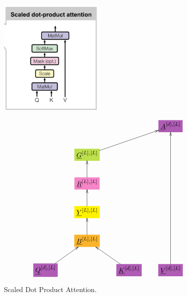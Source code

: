 \documentclass[12pt]{article}
\begin{document}
\begin{figure}[h!]\centering
\begin{minipage}{.5\linewidth}
\includegraphics[width=2in]{scaled-dot-prod-att.jpg}
\end{minipage}%
\begin{minipage}{.5\linewidth}
$$\xymatrix{
&&&*+[F*:Orchid]{\underline{A}^{[d], [L]}}
\\
&*+[F*:SpringGreen]{\underline{G}^{[L], [L]}}\ar[urr]&&
\\
&*+[F*:Lavender]{\underline{R}^{[L], [L]}}\ar[u]&&
\\
&*+[F*:yellow]{\underline{Y}^{[L],[L]}}\ar[u]&&
\\
&*+[F*:Dandelion]{\underline{B}^{[L], [L]}}\ar[u]&&
\\
*+[F*:Orchid]{\underline{Q}^{[d],[L]}}\ar[ur]&&*+[F*:Orchid]{\underline{K}^{[d],[L]}}\ar[ul]&*+[F*:Orchid]{\underline{V}^{[d],[L]}}\ar[uuuuu]
}$$
\end{minipage}
\caption{Scaled Dot Product Attention.}
\label{fig-texnn-for-scaled-dot-prod-att}
\end{figure}
\end{document}
